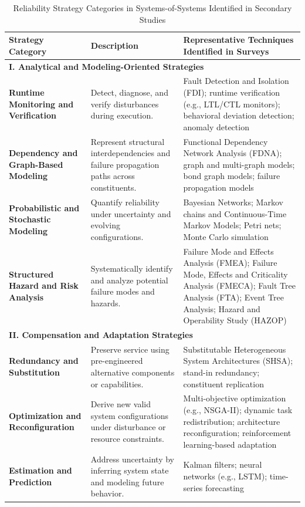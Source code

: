 \begin{table}[t]
\small
\centering
\caption{Reliability Strategy Categories in Systems-of-Systems Identified in Secondary Studies}
\label{tab:sos-reliability-strategies}
\renewcommand{\arraystretch}{1.25}
\begin{tabular}{p{3.5cm} p{4.5cm} p{6.5cm}}
\toprule
\textbf{Strategy Category} & \textbf{Description} & \textbf{Representative Techniques Identified in Surveys} \\
\midrule

\multicolumn{3}{l}{\textbf{I. Analytical and Modeling-Oriented Strategies}} \\
\midrule

\textbf{Runtime Monitoring and Verification} 
& Detect, diagnose, and verify disturbances during execution. 
& Fault Detection and Isolation (FDI); runtime verification (e.g., LTL/CTL monitors); behavioral deviation detection; anomaly detection \\

\textbf{Dependency and Graph-Based Modeling} 
& Represent structural interdependencies and failure propagation paths across constituents. 
& Functional Dependency Network Analysis (FDNA); graph and multi-graph models; bond graph models; failure propagation models \\

\textbf{Probabilistic and Stochastic Modeling} 
& Quantify reliability under uncertainty and evolving configurations. 
& Bayesian Networks; Markov chains and Continuous-Time Markov Models; Petri nets; Monte Carlo simulation \\

\textbf{Structured Hazard and Risk Analysis} 
& Systematically identify and analyze potential failure modes and hazards. 
& Failure Mode and Effects Analysis (FMEA); Failure Mode, Effects and Criticality Analysis (FMECA); Fault Tree Analysis (FTA); Event Tree Analysis; Hazard and Operability Study (HAZOP) \\

\midrule
\multicolumn{3}{l}{\textbf{II. Compensation and Adaptation Strategies}} \\
\midrule

\textbf{Redundancy and Substitution} 
& Preserve service using pre-engineered alternative components or capabilities. 
& Substitutable Heterogeneous System Architectures (SHSA); stand-in redundancy; constituent replication \\

\textbf{Optimization and Reconfiguration} 
& Derive new valid system configurations under disturbance or resource constraints. 
& Multi-objective optimization (e.g., NSGA-II); dynamic task redistribution; architecture reconfiguration; reinforcement learning-based adaptation \\

\textbf{Estimation and Prediction} 
& Address uncertainty by inferring system state and modeling future behavior. 
& Kalman filters; neural networks (e.g., LSTM); time-series forecasting \\

\bottomrule
\end{tabular}
\end{table}
